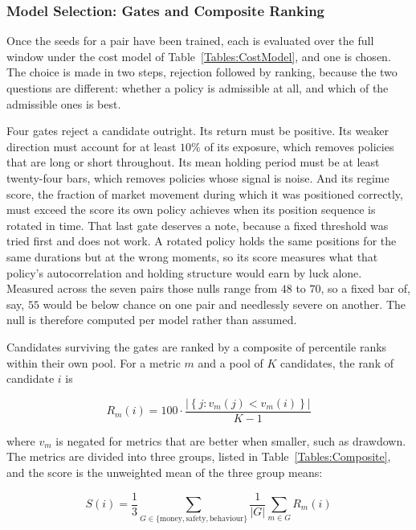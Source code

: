 \subsubsection{Model Selection: Gates and Composite Ranking}

Once the seeds for a pair have been trained, each is evaluated over the full window under the cost model of Table~\ref{Tables:CostModel}, and one is chosen. The choice is made in two steps, rejection followed by ranking, because the two questions are different: whether a policy is admissible at all, and which of the admissible ones is best.

Four gates reject a candidate outright. Its return must be positive. Its weaker direction must account for at least $10\%$ of its exposure, which removes policies that are long or short throughout. Its mean holding period must be at least twenty-four bars, which removes policies whose signal is noise. And its regime score, the fraction of market movement during which it was positioned correctly, must exceed the score its own policy achieves when its position sequence is rotated in time. That last gate deserves a note, because a fixed threshold was tried first and does not work. A rotated policy holds the same positions for the same durations but at the wrong moments, so its score measures what that policy's autocorrelation and holding structure would earn by luck alone. Measured across the seven pairs those nulls range from $48$ to $70$, so a fixed bar of, say, $55$ would be below chance on one pair and needlessly severe on another. The null is therefore computed per model rather than assumed.

Candidates surviving the gates are ranked by a composite of percentile ranks within their own pool. For a metric $m$ and a pool of $K$ candidates, the rank of candidate $i$ is

\begin{equation}
R_m(i) = 100 \cdot \frac{\left|\left\{ j : v_m(j) < v_m(i) \right\}\right|}{K - 1}
\label{Equation:PercentileRank}
\end{equation}

where $v_m$ is negated for metrics that are better when smaller, such as drawdown. The metrics are divided into three groups, listed in Table~\ref{Tables:Composite}, and the score is the unweighted mean of the three group means:

\begin{equation}
S(i) = \frac{1}{3} \sum_{G \in \{\text{money}, \text{safety}, \text{behaviour}\}} \frac{1}{|G|} \sum_{m \in G} R_m(i)
\label{Equation:Composite}
\end{equation}

